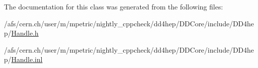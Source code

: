 The documentation for this class was generated from the following files\+:\begin{DoxyCompactItemize}
\item 
/afs/cern.\+ch/user/m/mpetric/nightly\+\_\+cppcheck/dd4hep/\+D\+D\+Core/include/\+D\+D4hep/\hyperlink{_handle_8h}{Handle.\+h}\item 
/afs/cern.\+ch/user/m/mpetric/nightly\+\_\+cppcheck/dd4hep/\+D\+D\+Core/include/\+D\+D4hep/\hyperlink{_handle_8inl}{Handle.\+inl}\end{DoxyCompactItemize}
